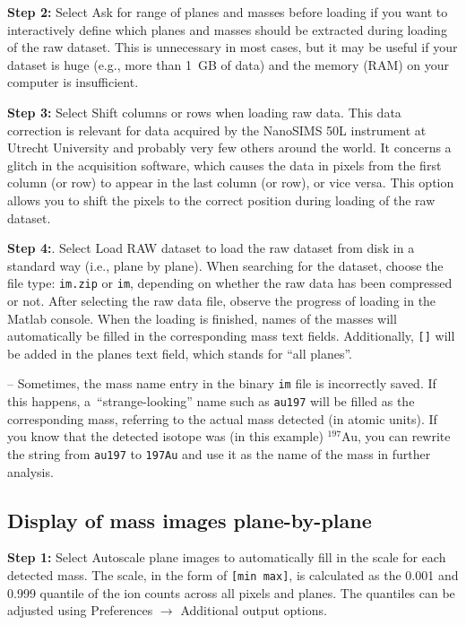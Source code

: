 \documentclass[a4paper, 11pt]{article}
\newcommand{\ttt}[1]{\texttt{#1}}
\newcommand{\lans}[1]{{\color{magenta}#1}}
\newcommand{\lanstf}[1]{{\color{cyan}#1}}
\newcommand\ra{\rightarrow}
\newcommand\addon[1]{-- {\small #1}}
\newcommand\s[1]{\noindent\textbf{Step #1:}}
\begin{document}
\s2 Select \lans{Ask for range of planes and masses before loading} if you want to interactively define which planes and masses should be extracted during loading of the raw dataset. This is unnecessary in most cases, but it may be useful if your dataset is huge (e.g., more than 1~GB of data) and the memory (RAM) on your computer is insufficient.

\s3 Select \lans{Shift columns or rows when loading raw data}. This data correction is relevant for data acquired by the NanoSIMS 50L instrument at Utrecht University and probably very few others around the world. It concerns a glitch in the acquisition software, which causes the data in pixels from the first column (or row) to appear in the last column (or row), or vice versa. This option allows you to shift the pixels to the correct position during loading of the raw dataset.

\s4. Select \lans{Load RAW dataset} to load the raw dataset from disk in a standard way (i.e., plane by plane). When searching for the dataset, choose the file type: \ttt{im.zip} or \ttt{im}, depending on whether the raw data has been compressed or not. After selecting the raw data file, observe the progress of loading in the Matlab console. When the loading is finished, names of the masses will automatically be filled in the corresponding \lanstf{mass} text fields. Additionally, \ttt{[]} will be added in the \lanstf{planes} text field, which stands for ``all planes''.

\addon{Sometimes, the mass name entry in the binary \ttt{im} file is incorrectly saved. If this happens, a~``strange-looking'' name such as \ttt{au197} will be filled as the corresponding \lanstf{mass}, referring to the actual mass detected (in atomic units). If you know that the detected isotope was (in this example) ${}^{197}$Au, you can rewrite the string from \ttt{au197} to \ttt{197Au} and use it as the name of the mass in further analysis.}


\subsection{Display of mass images plane-by-plane}

\s1 Select \lans{Autoscale plane images} to automatically fill in the \lanstf{scale} for each detected mass. The scale, in the form of \ttt{[min max]}, is calculated as the 0.001 and 0.999 quantile of the ion counts across all pixels and planes. The quantiles can be adjusted using \lans{Preferences} $\ra$ \lans{Additional output options}. 
\end{document}
